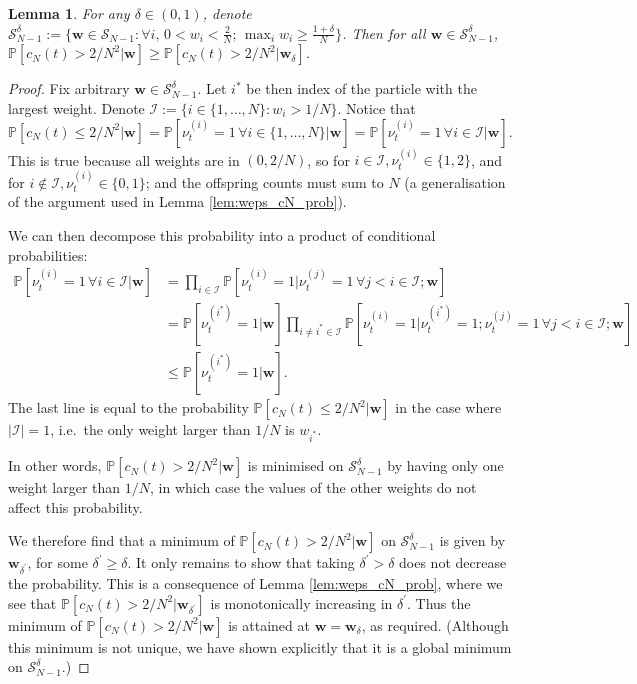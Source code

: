 \documentclass{article}
\newtheorem{lemma}{Lemma}
\newcommand{\PR}{\mathbb{P}}
\newcommand{\1}[1]{\mathbb{I}_{#1}}
\begin{document}
\begin{lemma}
For any $\delta \in (0, 1)$, denote $\mathcal{S}_{N-1}^\delta := \{ \mathbf{w} \in \mathcal{S}_{N-1} :  \forall i, \, 0 <w_i <\frac{2}{N} ;\, \max_i w_i \geq \frac{1 + \delta}{N} \}$.
Then for all $\mathbf{w} \in \mathcal{S}_{N-1}^\delta$, 
$\PR[c_N(t) > 2/N^2 | \mathbf{w} ] \geq \PR[c_N(t) > 2/N^2 | \mathbf{w}_\delta ]$.
\end{lemma}

\begin{proof}
Fix arbitrary $\mathbf{w} \in \mathcal{S}_{N-1}^\delta$. Let $i^*$ be then index of the particle with the largest weight.
Denote $\mathcal{I} := \{i \in \{1,\dots,N\} : w_i > 1/N \}$.
Notice that 
\begin{equation*}
\PR[ c_N(t) \leq 2/N^2 | \mathbf{w} ] 
= \PR[ \nu_t^{(i)} =1 \,\forall i\in\{1,\dots,N\} | \mathbf{w}] 
= \PR[ \nu_t^{(i)} =1 \,\forall i\in \mathcal{I} | \mathbf{w}] .
\end{equation*}
This is true because all weights are in $(0, 2/N)$, so for $i \in \mathcal{I}, \nu_t^{(i)} \in \{1,2\}$, and for $i \notin \mathcal{I}, \nu_t^{(i)} \in \{0,1\}$; and the offspring counts must sum to $N$ (a generalisation of the argument used in Lemma \ref{lem:weps_cN_prob}).

We can then decompose this probability into a product of conditional probabilities:
\begin{align*}
\PR[ \nu_t^{(i)} =1 \,\forall i\in \mathcal{I} | \mathbf{w}]
&= \prod_{i \in \mathcal{I}} \PR[ \nu_t^{(i)} =1 | \nu_t^{(j)}=1 \,\forall j <i \in \mathcal{I}; \mathbf{w}] \\
&= \PR[\nu_t^{(i^*)} =1 | \mathbf{w}] \prod_{i \neq i^* \in \mathcal{I}} \PR[ \nu_t^{(i)} =1 | \nu_t^{(i^*)}=1; \nu_t^{(j)}=1 \,\forall j <i \in \mathcal{I}; \mathbf{w}] \\
&\leq \PR[\nu_t^{(i^*)} =1 | \mathbf{w}] .
\end{align*}
The last line is equal to the probability $\PR[ c_N(t) \leq 2/N^2 | \mathbf{w} ] $ in the case where $|\mathcal{I}| =1$, i.e.\ the only weight larger than $1/N$ is $w_{i^*}$.

In other words, $\PR[ c_N(t) > 2/N^2 | \mathbf{w} ]$ is minimised on $\mathcal{S}_{N-1}^\delta$ by having only one weight larger than $1/N$, in which case the values of the other weights do not affect this probability. 

We therefore find that a minimum of $\PR[ c_N(t) > 2/N^2 | \mathbf{w} ]$ on $\mathcal{S}_{N-1}^\delta$ is given by $\mathbf{w}_{\delta^\prime}$, for some $\delta^\prime \geq \delta$. 
It only remains to show that taking $\delta^\prime > \delta$ does not decrease the probability. This is a consequence of Lemma \ref{lem:weps_cN_prob}, where we see that $\PR[ c_N(t) > 2/N^2 | \mathbf{w}_{\delta^\prime}]$ is monotonically increasing in $\delta^\prime$.
Thus the minimum of $\PR[ c_N(t) > 2/N^2 | \mathbf{w} ]$ is attained at $\mathbf{w} = \mathbf{w}_\delta$, as required. (Although this minimum is not unique, we have shown explicitly that it is a global minimum on $\mathcal{S}_{N-1}^\delta$.)
\end{proof}
\end{document}
